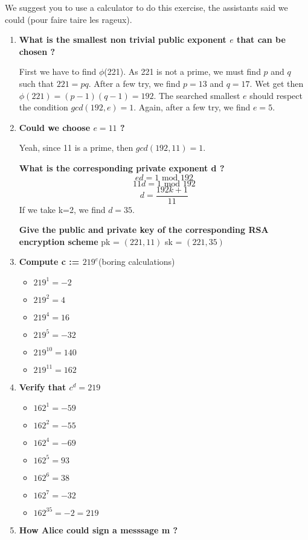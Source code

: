 \begin{solution}
We suggest you to use a calculator to do this exercise, the assistants said we could (pour faire taire les rageux).
  \begin{enumerate}
      \item \textbf{What is the smallest non trivial public exponent $e$ that can be chosen ?} 
      
      First we have to find $\phi$(221). As 221 is not a prime, we must find $p$ and $q$ such that $221 = pq$. After a few try, we find $p = 13$ and $q = 17$. Wet get then $\phi(221) = (p-1)(q-1) = 192$. \newline 
      The searched smallest $e$ should respect the condition $gcd(192, e) = 1$. Again, after a few try, we find $e = 5$.
      \item \textbf{Could we choose $e = 11$ ?} 
      
      Yeah, since 11 is a prime, then $gcd(192, 11) = 1$. 
      
      \textbf{What is the corresponding private exponent d ?} 
      $$ ed = 1 \text{ mod 192}$$ $$11d = 1 \text{ mod 192}$$ $$d = \frac{192k + 1}{11}$$
      If we take k=2, we find $d = 35$.
      
      \textbf{Give the public and private key of the corresponding RSA encryption scheme} \newline
      pk = $(221, 11)$ 
      sk = $(221, 35)$
      \item \textbf{Compute c := $219^e$}(boring calculations) 
      \begin{itemize}
          \item $219^{1} = -2 $
          \item $219^{2} = 4  $
          \item $219^{4} = 16 $
          \item $219^{5} = -32$
          \item $219^{10} = 140$
          \item $219^{11} = 162$
      \end{itemize}
      \item \textbf{Verify that $c^d = 219$} 
      \begin{itemize}
          \item $162^{1} = -59 $
          \item $162^{2} = -55 $
          \item $162^{4} = -69 $
          \item $162^{5} = 93 $
          \item $162^{6} = 38 $
          \item $162^{7} = -32 $
          \item $162^{35} = -2 = 219 $
      \end{itemize}
      \item \textbf{How Alice could sign a messsage m ?} 
      

\end{enumerate}
\end{solution}
